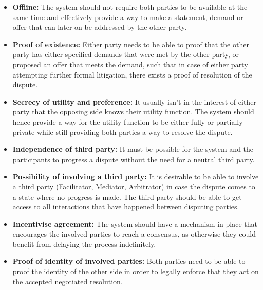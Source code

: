 \documentclass[12pt,msc,a4paper,oneside]{ucl_thesis}
\begin{document}
\begin{itemize}

    \item{\textbf{Offline:}} The system should not require both parties to be available at the same time and effectively provide a way to make a statement, demand or offer that can later on be addressed by the other party.

    \item{\textbf{Proof of existence:}} Either party needs to be able to proof that the other party has either specified demands that were met by the other party, or proposed an offer that meets the demand, such that in case of either party attempting further formal litigation, there exists a proof of resolution of the dispute.

    \item{\textbf{Secrecy of utility and preference:}} It usually isn't in the interest of either party that the opposing side knows their utility function. The system should hence provide a way for the utility function to be either fully or partially private while still providing both parties a way to resolve the dispute.

    \item{\textbf{Independence of third party:}} It must be possible for the system and the participants to progress a dispute without the need for a neutral third party.

    \item{\textbf{Possibility of involving a third party:}} It is desirable to be able to involve a third party (Facilitator, Mediator, Arbitrator) in case the dispute comes to a state where no progress is made. The third party should be able to get access to all interactions that have happened between disputing parties.

    \item{\textbf{Incentivise agreement:}} The system should have a mechanism in place that encourages the involved parties to reach a consensus, as otherwise they could benefit from delaying the process indefinitely.

    \item{\textbf{Proof of identity of involved parties:}} Both parties need to be able to proof the identity of the other side in order to legally enforce that they act on the accepted negotiated resolution.

\end{itemize}
\end{document}
